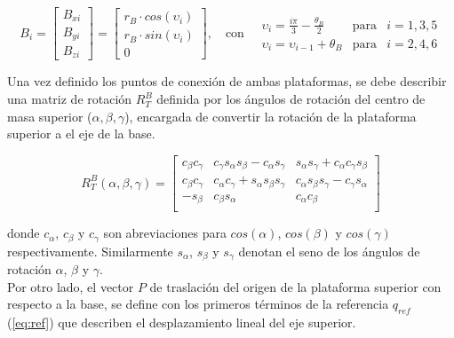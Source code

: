 \begin{equation}
    B_i = \begin{bmatrix} 
        B_{xi} \\ B_{yi} \\ B_{zi} 
    \end{bmatrix} = 
    \begin{bmatrix} 
        r_{B} \cdot cos(\upsilon_i) \\ r_{B} \cdot sin(\upsilon_i) \\ 0 
    \end{bmatrix} , \quad \textrm{con} \quad
    \begin{array}{lcc}
         \upsilon_i = \frac{i\pi}{3} - \frac{\theta_{B}}{2} & \textrm{para} & i=1,3,5 \\
         \upsilon_i = \upsilon_{i-1}+\theta_{B} & \textrm{para} & i=2,4,6
    \end{array}
\end{equation}

Una vez definido los puntos de conexión de ambas plataformas, se debe describir una matriz de rotación $R_{T}^{B}$ definida por los ángulos de rotación del centro de masa superior ($\alpha, \beta, \gamma$), encargada de convertir la rotación de la plataforma superior a el eje de la base. 

\begin{equation}
    R_T^B(\alpha,\beta,\gamma) = \begin{bmatrix}
        c_\beta c_\gamma & c_\gamma s_\alpha s_\beta - c_\alpha s_\gamma & s_\alpha s_\gamma + c_\alpha c_\gamma s_\beta \\
        c_\beta c_\gamma & c_\alpha c_\gamma + s_\alpha s_\beta s_\gamma & c_\alpha s_\beta s_\gamma - c_\gamma s_\alpha \\
        -s_\beta & c_\beta s_\alpha & c_\alpha c_\beta \\
    \end{bmatrix}
\end{equation}

donde $c_\alpha$, $c_\beta$ y $c_\gamma$ son abreviaciones para $cos(\alpha)$, $cos(\beta)$ y $cos(\gamma)$ respectivamente. Similarmente $s_\alpha$, $s_\beta$ y $s_\gamma$ denotan el seno de los ángulos de rotación $\alpha$, $\beta$ y $\gamma$.\\

Por otro lado, el vector $P$ de traslación del origen de la plataforma superior con respecto a la base, se define con los primeros términos de la referencia $q_{ref}$ (\ref{eq:ref}) que describen el desplazamiento lineal del eje superior.

